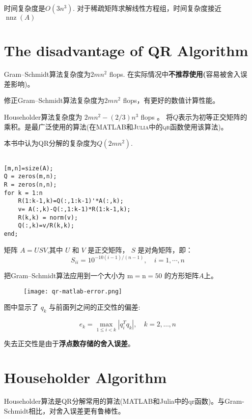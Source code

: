 时间复杂度是$O(3n^3)$. 对于稀疏矩阵求解线性方程组，时间复杂度接近$\operatorname{nnz}(A)$

\section{The disadvantage of QR Algorithm}

Gram–Schmidt算法复杂度为$2mn^2$ flops. 在实际情况中\textbf{不推荐使用(}容易被舍入误差影响)。

修正Gram–Schmidt算法复杂度为$2mn^2$ flops，有更好的数值计算性能。

Householder算法复杂度为 $ 2 m n^{2}-(2 / 3) n^{3} $ flops 。
将$Q$表示为初等正交矩阵的乘积。是最广泛使用的算法(在\textsc{MATLAB}和\textsc{Julia}中的\textsc{qr}函数使用该算法)。

本书中认为QR分解的复杂度为$Q(2mn^2)$.

\begin{example}
    \begin{verbatim}

[m,n]=size(A);
Q = zeros(m,n);
R = zeros(n,n);
for k = 1:n
    R(1:k-1,k)=Q(:,1:k-1)'*A(:,k);
    v= A(:,k)-Q(:,1:k-1)*R(1:k-1,k);
    R(k,k) = norm(v);
    Q(:,k)=v/R(k,k);
end;
    \end{verbatim}

    矩阵 $ A=U S V $,其中 $ U $ 和 $ V $ 是正交矩阵， $ S $ 是对角矩阵，即：
    $$
    S_{i i}=10^{-10(i-1) /(n-1)}, \quad i=1, \cdots, n
    $$

    把Gram–Schmidt算法应用到一个大小为 $ \mathrm{m}=\mathrm{n}=50 $ 的方形矩阵$A$上。

    \begin{figure}[htbp]
        \centering
        \texttt{[image: qr-matlab-error.png]}
        
    \end{figure}

    图中显示了 $ q_{k} $ 与前面列之间的正交性的偏差:

    $$
    e_{k}=\max _{1 \leq i<k}\left|q_{i}^{T} q_{k}\right|, \quad k=2, \ldots, n
    $$

    失去正交性是由于\textbf{浮点数存储的舍入误差}。
\end{example}

\section{Householder Algorithm}

Householder算法是QR分解常用的算法(MATLAB和Julia中的qr函数)。与Gram-Schmidt相比，对舍入误差更有鲁棒性。

